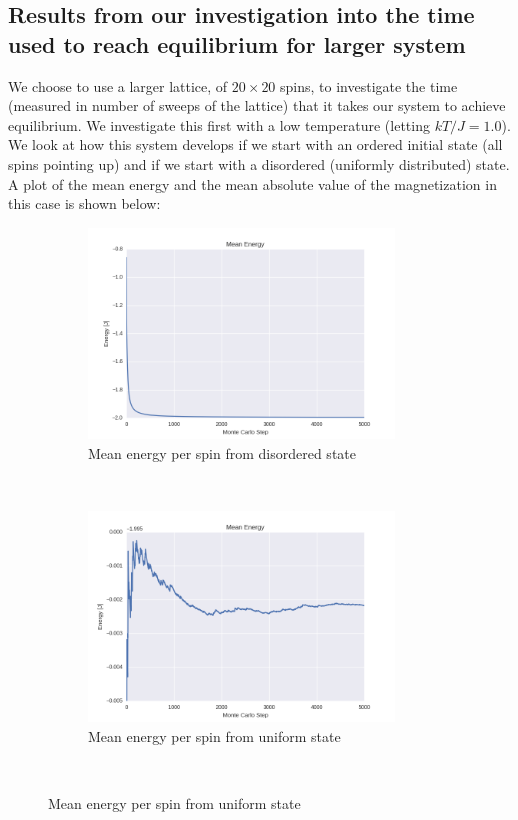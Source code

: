 \documentclass[a4paper, 10pt]{article}
\begin{document}
\subsection{Results from our investigation into the time used to reach equilibrium for larger system}
We choose to use a larger lattice, of $20 \times 20$ spins, to investigate the time (measured in number of sweeps of the lattice) that it takes our system to achieve equilibrium. We investigate this first with a low temperature (letting $kT/J=1.0$). We look at how this system develops if we start with an ordered initial state (all spins pointing up) and if we start with a disordered (uniformly distributed) state. A plot of the mean energy and the mean absolute value of the magnetization in this case is shown below:\\
\begin{figure}[!ht]
    \centering
    \begin{subfigure}[H!]{0.5\textwidth}
        \centering
        \includegraphics[height=2.2in]{meanEnergyWRandomStart.png}
        \caption{Mean energy per spin from disordered state}
    \end{subfigure}%
    ~ 
    \begin{subfigure}[H!]{0.5\textwidth}
        \centering
        \includegraphics[height=2.2in]{meanEnergyWUpStart.png}
        \caption{Mean energy per spin from uniform state}
    \end{subfigure}
        ~

\end{figure}
\end{document}
